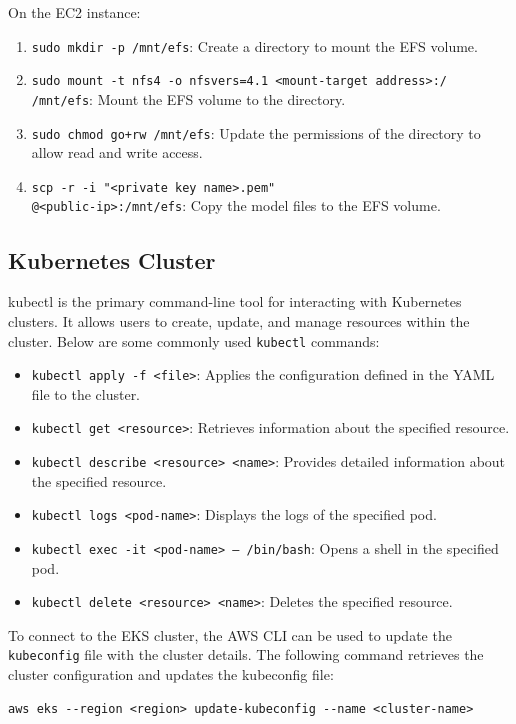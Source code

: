 On the EC2 instance:
\begin{enumerate}
    \item \texttt{sudo mkdir -p /mnt/efs}: Create a directory to mount the EFS volume.
    \item 
        \begin{sloppypar}
            \texttt{sudo mount -t nfs4 -o nfsvers=4.1 <mount-target address>:/ /mnt/efs}: Mount the EFS volume to the directory.
        \end{sloppypar}
    \item \texttt{sudo chmod go+rw /mnt/efs}: Update the permissions of the directory to allow read and write access.

    \item 
        \begin{sloppypar}
            \texttt{scp -r -i "<private key name>.pem" \\<model-directory>@<public-ip>:/mnt/efs}: Copy the model files to the EFS volume.
        \end{sloppypar}
\end{enumerate}

\subsection{Kubernetes Cluster}
kubectl is the primary command-line tool for interacting with Kubernetes clusters. It allows users to create, update, and manage resources within the cluster. Below are some commonly used \texttt{kubectl} commands:

\begin{itemize}
    \item \texttt{kubectl apply -f <file>}: Applies the configuration defined in the YAML file to the cluster.
    \item \texttt{kubectl get <resource>}: Retrieves information about the specified resource.
    \item \texttt{kubectl describe <resource> <name>}: Provides detailed information about the specified resource.
    \item \texttt{kubectl logs <pod-name>}: Displays the logs of the specified pod.
    \item \texttt{kubectl exec -it <pod-name> -- /bin/bash}: Opens a shell in the specified pod.
    \item \texttt{kubectl delete <resource> <name>}: Deletes the specified resource.
\end{itemize}

To connect to the EKS cluster, the AWS CLI can be used to update the \texttt{kubeconfig} file with the cluster details. The following command retrieves the cluster configuration and updates the kubeconfig file:
\begin{verbatim}
aws eks --region <region> update-kubeconfig --name <cluster-name>
\end{verbatim}

